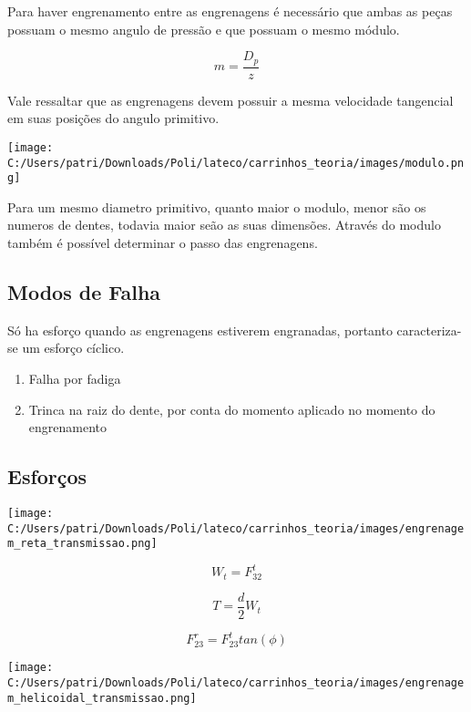 \begin{namedthereom}[Evolvente]
Para haver engrenamento entre as engrenagens é necessário que ambas as peças possuam o mesmo angulo de pressão e que possuam o mesmo módulo.

$$ m = \frac{D_p}{z} $$

Vale ressaltar que as engrenagens devem possuir a mesma velocidade tangencial em suas posições do angulo primitivo.

	\begin{center}
	\texttt{[image: C:/Users/patri/Downloads/Poli/lateco/carrinhos\_teoria/images/modulo.png]}
	\end{center}
	
Para um mesmo diametro primitivo, quanto maior o modulo, menor são os numeros de dentes, todavia maior seão as suas dimensões. Através do modulo também é possível determinar o passo das engrenagens.

\subsection{Modos de Falha}

Só ha esforço quando as engrenagens estiverem engranadas, portanto caracteriza-se um esforço cíclico. 

\begin{enumerate}
	\item Falha por fadiga
	\item Trinca na raiz do dente, por conta do momento aplicado no momento do engrenamento
\end{enumerate}

\subsection{Esforços}

	\begin{center}
	\texttt{[image: C:/Users/patri/Downloads/Poli/lateco/carrinhos\_teoria/images/engrenagem\_reta\_transmissao.png]}
	\end{center}
	
	$$ W_t = F_{32}^t $$
	
	$$ T = \frac{d}{2}W_t $$
	
	$$ F_{23}^r = F_{23}^t tan(\phi) $$
	
	\begin{center}
	\texttt{[image: C:/Users/patri/Downloads/Poli/lateco/carrinhos\_teoria/images/engrenagem\_helicoidal\_transmissao.png]}
	\end{center}
	

\end{namedthereom}
